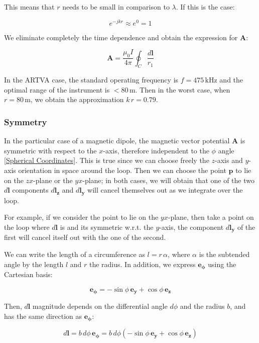 This means that $r$ needs to be small in comparison 
to $\lambda$. If this is the case:

\[
    e^{-j k r} \approx e^0 = 1
\]

We eliminate completely the time dependence and 
obtain the expression for $\mathbf{A}$:

\begin{equation}
    \mathbf{A} = \frac{\mu_0 I}{4\pi} \oint_C 
    \frac{d\mathbf{l}}{r_1}
    \label{A_approx}
\end{equation}

In the ARTVA case, the standard operating frequency 
is \( f = 475 \, \text{kHz} \) and the optimal range 
of the instrument is \( <80 \, \text{m} \). Then in 
the worst case, when \( r = 80 \, \text{m} \), we 
obtain the approximation \( k \, r = 0.79 \).

\subsubsection{Symmetry}

In the particular case of a magnetic dipole, the 
magnetic vector potential $\mathbf{A}$ is symmetric 
with respect to the \(x\)-axis, therefore independent 
to the $\phi$ angle \ref{Spherical Coordinates}. 
This is true since we can choose freely the $z$-axis 
and $y$-axis orientation in space around the loop. 
Then we can choose the point $\mathbf{p}$ to lie on 
the $zx$-plane or the $yx$-plane; in both cases, we 
will obtain that one of the two $d\mathbf{l}$ 
components $d\mathbf{l_z}$ and $d\mathbf{l_y}$ will 
cancel themselves out as we integrate over the loop.

For example, if we consider the point to lie on the 
$yx$-plane, then take a point on the loop where 
$d\mathbf{l}$ is and its symmetric w.r.t. the 
$y$-axis, the component $d\mathbf{l_y}$ of the first 
will cancel itself out with the one of the second.

We can write the length of a circumference as 
$l = r \, \alpha$, where $\alpha$ is the subtended 
angle by the length $l$ and $r$ the radius. In 
addition, we express $\mathbf{e_\phi}$ using the 
Cartesian basis:

$$
    \mathbf{e_\phi} = - \sin\phi \, \mathbf{e_y} 
    + \cos\phi \, \mathbf{e_z}
$$

Then, $d\mathbf{l}$ magnitude depends on the 
differential angle $d\phi$ and the radius $b$, and 
has the same direction as $\mathbf{e_\phi}$:

\begin{equation}
    d\mathbf{l} = b \, d\phi \, \mathbf{e_\phi} 
    = b \, d\phi \left(- \sin\phi \, \mathbf{e_y} 
    + \cos\phi \, \mathbf{e_z}\right)
    \label{eq:dl}
\end{equation}

